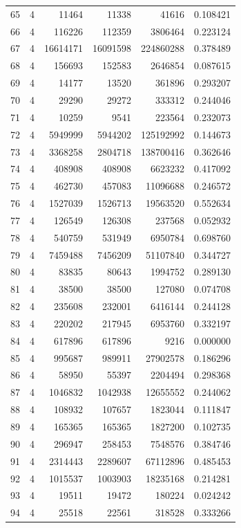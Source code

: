 \begin{longtable}{rrrrrr}
65 & 4 & 11464 & 11338 & 41616 & 0.108421\\
66 & 4 & 116226 & 112359 & 3806464 & 0.223124\\
67 & 4 & 16614171 & 16091598 & 224860288 & 0.378489\\
68 & 4 & 156693 & 152583 & 2646854 & 0.087615\\
69 & 4 & 14177 & 13520 & 361896 & 0.293207\\
70 & 4 & 29290 & 29272 & 333312 & 0.244046\\
71 & 4 & 10259 & 9541 & 223564 & 0.232073\\
72 & 4 & 5949999 & 5944202 & 125192992 & 0.144673\\
73 & 4 & 3368258 & 2804718 & 138700416 & 0.362646\\
74 & 4 & 408908 & 408908 & 6623232 & 0.417092\\
75 & 4 & 462730 & 457083 & 11096688 & 0.246572\\
76 & 4 & 1527039 & 1526713 & 19563520 & 0.552634\\
77 & 4 & 126549 & 126308 & 237568 & 0.052932\\
78 & 4 & 540759 & 531949 & 6950784 & 0.698760\\
79 & 4 & 7459488 & 7456209 & 51107840 & 0.344727\\
80 & 4 & 83835 & 80643 & 1994752 & 0.289130\\
81 & 4 & 38500 & 38500 & 127080 & 0.074708\\
82 & 4 & 235608 & 232001 & 6416144 & 0.244128\\
83 & 4 & 220202 & 217945 & 6953760 & 0.332197\\
84 & 4 & 617896 & 617896 & 9216 & 0.000000\\
85 & 4 & 995687 & 989911 & 27902578 & 0.186296\\
86 & 4 & 58950 & 55397 & 2204494 & 0.298368\\
87 & 4 & 1046832 & 1042938 & 12655552 & 0.244062\\
88 & 4 & 108932 & 107657 & 1823044 & 0.111847\\
89 & 4 & 165365 & 165365 & 1827200 & 0.102735\\
90 & 4 & 296947 & 258453 & 7548576 & 0.384746\\
91 & 4 & 2314443 & 2289607 & 67112896 & 0.485453\\
92 & 4 & 1015537 & 1003903 & 18235168 & 0.214281\\
93 & 4 & 19511 & 19472 & 180224 & 0.024242\\
94 & 4 & 25518 & 22561 & 318528 & 0.333266\\

\end{longtable}
